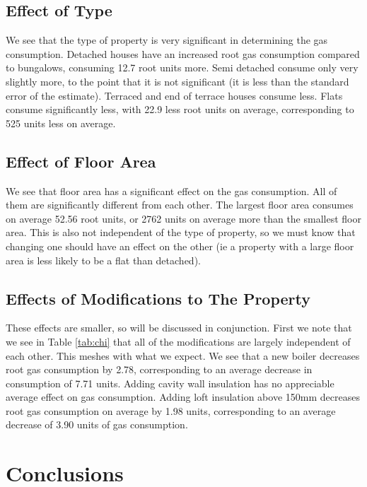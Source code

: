 \documentclass[9pt]{extarticle}
\begin{document}
\subsection{Effect of Type}
We see that the type of property is very significant in determining the gas consumption. Detached houses have an increased root gas consumption compared to bungalows, consuming 12.7 root units more. Semi detached consume only very slightly more, to the point that it is not significant (it is less than the standard error of the estimate). Terraced and end of terrace houses consume less. Flats consume significantly less, with 22.9 less root units on average, corresponding to 525 units less on average. 

\subsection{Effect of Floor Area}
We see that floor area has a significant effect on the gas consumption. All of them are significantly different from each other. The largest floor area consumes on average 52.56 root units, or 2762 units on average more than the smallest floor area. This is also not independent of the type of property, so we must know that changing one should have an effect on the other (ie a property with a large floor area is less likely to be a flat than detached).

\subsection{Effects of Modifications to The Property}
These effects are smaller, so will be discussed in conjunction. First we note that we see in Table \ref{tab:chi} that all of the modifications are largely independent of each other. This meshes with what we expect. We see that a new boiler decreases root gas consumption by 2.78, corresponding to an average decrease in consumption of 7.71 units. Adding cavity wall insulation has no appreciable average effect on gas consumption. Adding loft insulation above 150mm decreases root gas consumption on average by 1.98 units, corresponding to an average decrease of 3.90 units of gas consumption. 


\section{Conclusions}

%

\appendix
\end{document}
